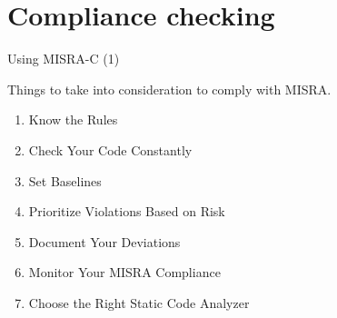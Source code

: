 \documentclass[t]{beamer} %
\begin{document}


\section{Compliance checking}
\begin{frame}[fragile]{Using MISRA-C (1) }
    \begin{block}{Things to take into consideration to comply with MISRA.}     
    \begin{enumerate}
            \item Know the Rules
            \item Check Your Code Constantly
            \item Set Baselines
            \item Prioritize Violations Based on Risk
            \item Document Your Deviations
            \item Monitor Your MISRA Compliance
            \item Choose the Right Static Code Analyzer
         \end{enumerate}
    \end{block}  
\end{frame}

\end{document}
